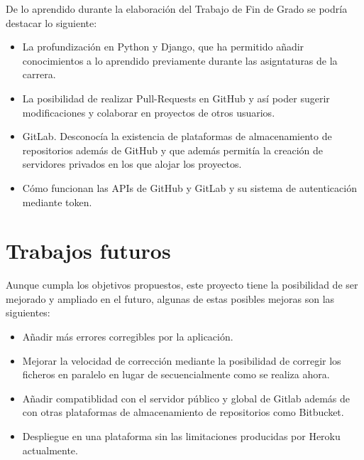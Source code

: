 \documentclass[a4paper, 12pt]{book}
\begin{document}
De lo aprendido durante la elaboración del Trabajo de Fin de Grado se podría destacar lo siguiente:

\begin{itemize}
  \item La profundización en Python y Django, que ha permitido añadir conocimientos a lo aprendido previamente durante las asigntaturas de la carrera.
  \item La posibilidad de realizar Pull-Requests en GitHub y así poder sugerir modificaciones y colaborar en proyectos de otros usuarios.
  \item GitLab. Desconocía la existencia de plataformas de almacenamiento de repositorios además de GitHub y que además permitía la creación de servidores privados en los que alojar los proyectos.
  \item Cómo funcionan las APIs de GitHub y GitLab y su sistema de autenticación mediante token.
\end{itemize}

\section{Trabajos futuros}
\label{sec:trabajos_futuros}

Aunque cumpla los objetivos propuestos, este proyecto tiene la posibilidad de ser mejorado y ampliado en el futuro, algunas de estas posibles mejoras son las siguientes:

\begin{itemize}
  \item Añadir más errores corregibles por la aplicación. 
  \item Mejorar la velocidad de corrección mediante la posibilidad de corregir los ficheros en paralelo en lugar de secuencialmente como se realiza ahora.
  \item Añadir compatiblidad con el servidor público y global de Gitlab además de con otras plataformas de almacenamiento de repositorios como Bitbucket.
  \item Despliegue en una plataforma sin las limitaciones producidas por Heroku actualmente.
\end{itemize}


\cleardoublepage
\appendix
\end{document}
